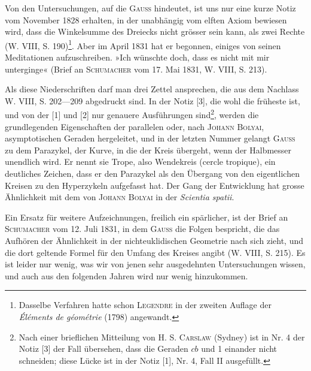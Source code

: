 \par
Von den Untersuchungen, auf die \textsc{Gauss} hindeutet, ist uns nur eine kurze
Notiz vom November 1828 erhalten, in der unabhängig vom elften Axiom
bewiesen wird, dass die Winkelsumme des Dreiecks nicht grösser sein kann,
als zwei Rechte (W. VIII, S. 190)\footnote{Dasselbe Verfahren hatte schon \textsc{Legendre} in der zweiten Auflage der \textit{Éléments de géométrie} (1798) angewandt.}. Aber im April 1831 hat er begonnen,
einiges von seinen Meditationen aufzuschreiben. »Ich wünschte doch, dass es
\clearpage{}\setcounter{footnote}{0}
\noindent nicht mit mir unterginge« (Brief an \textsc{Schumacher} vom 17. Mai 1831, W. VIII,
S. 213).
\par
Als diese Niederschriften darf man drei Zettel ansprechen, die aus dem
Nachlass W. VIII, S. 202—209 abgedruckt sind. In der Notiz [3], die wohl
die früheste ist, und von der [1] und [2] nur genauere Ausführungen sind\footnote{Nach einer brieflichen Mitteilung von H. S. \textsc{Carslaw} (Sydney) ist in Nr. 4 der Notiz [3] der Fall übersehen, dass die Geraden \(cb\) und {\scriptsize 1} einander nicht schneiden; diese Lücke ist in der Notiz [1], Nr. 4, Fall II ausgefüllt.},
werden die grundlegenden Eigenschaften der parallelen oder, nach \textsc{Johann
Bolyai}, asymptotischen Geraden hergeleitet, und in der letzten Nummer gelangt
\textsc{Gauss} zu dem Parazykel, der Kurve, in die der Kreis übergeht, wenn
der Halbmesser unendlich wird. Er nennt sie Trope, also Wendekreis (cercle
tropique), ein deutliches Zeichen, dass er den Parazykel als den Übergang
von den eigentlichen Kreisen zu den Hyperzykeln aufgefasst hat. Der Gang
der Entwicklung hat grosse Ähnlichkeit mit dem von \textsc{Johann Bolyai} in der
\textit{Scientia spatii}.
\par
Ein Ersatz für weitere Aufzeichnungen, freilich ein spärlicher, ist der
Brief an \textsc{Schumacher} vom 12. Juli 1831, in dem \textsc{Gauss} die Folgen bespricht,
die das Aufhören der Ähnlichkeit in der nichteuklidischen Geometrie nach
sich zieht, und die dort geltende Formel für den Umfang des Kreises angibt
(W. VIII, S. 215). Es ist leider nur wenig, was wir von jenen sehr ausgedehnten
Untersuchungen wissen, und auch aus den folgenden Jahren wird nur
wenig hinzukommen.
\clearpage\endgroup
